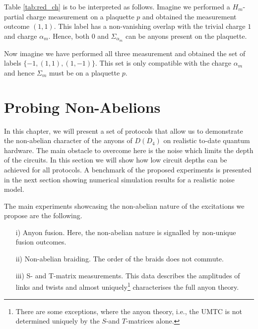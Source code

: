 \documentclass[two column]{article}
\begin{document}
Table \ref{tab:red_ch} is to be interpreted as follows. Imagine we performed a $H_m$-partial charge measurement on a plaquette $p$ and obtained the measurement outcome $(1,1)$. This label has a non-vanishing overlap with the trivial charge $1$ and charge $\alpha_m$. Hence, both $0$ and $\Sigma_{\alpha_m}$ can be anyons present on the plaquette.

Now imagine we have performed all three measurement and obtained the set of labels $\{-1, (1, 1), (1, -1)\}$. This set is only compatible with the charge $\alpha_m$ and hence $\Sigma_m$ must be on a plaquette $p$.

\section{Probing Non-Abelions} \label{sec:probing}

In this chapter, we will present a set of protocols that allow us to demonstrate the non-abelian character of the anyons of $D(D_4)$ on realistic to-date quantum hardware. The main obstacle to overcome here is the noise which limits the depth of the circuits. In this section we will show how low circuit depths can be achieved for all protocols. A benchmark of the proposed experiments is presented in the next section showing numerical simulation results for a realistic noise model.


The main experiments showcasing the non-abelian nature of the excitations we propose are the following.
\begin{itemize}

\item[i)] Anyon fusion. Here, the non-abelian nature is signalled by non-unique fusion outcomes.

\item[ii)] Non-abelian braiding. The order of the braids does not commute.

\item[iii)] S- and T-matrix measurements. This data describes the amplitudes of links and twists and almost uniquely\footnote{There are some exceptions, where the anyon theory, i.e., the UMTC is not determined uniquely by the $S$-and $T$-matrices alone\cite{notdetermined2021}.} characterises the full anyon theory.
\end{itemize}

\end{document}
